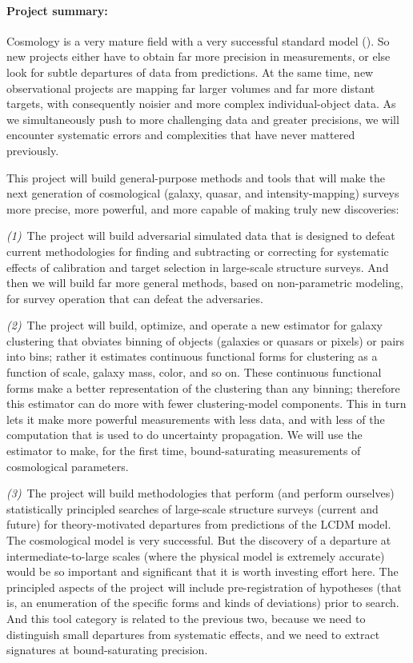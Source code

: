 \documentclass[12pt, fullpage, letterpaper]{article}
\newcommand{\LCDM}{\acronym{LCDM}}
\begin{document}
\paragraph{Project summary:}
Cosmology is a very mature field with a very successful standard model
(\LCDM).
So new projects either have to obtain far more precision in
measurements, or else look for subtle departures of data from
predictions.
At the same time, new observational projects are mapping far larger
volumes and far more distant targets, with consequently noisier and
more complex individual-object data.
As we simultaneously push to more challenging data and greater
precisions, we will encounter systematic errors and complexities that
have never mattered previously.

This project will build general-purpose methods and tools that will
make the next generation of cosmological (galaxy, quasar, and
intensity-mapping) surveys more precise, more powerful, and more
capable of making truly new discoveries:

\textsl{(1)}~The project will build adversarial simulated data that is designed to
defeat current methodologies for finding and subtracting or correcting
for systematic effects of calibration and target selection in
large-scale structure surveys.
And then we will build far more general methods, based on
non-parametric modeling, for survey operation that can defeat the
adversaries.

\textsl{(2)}~The project will build, optimize, and operate a new estimator for
galaxy clustering that obviates binning of objects (galaxies or
quasars or pixels) or pairs into bins; rather it estimates continuous
functional forms for clustering as a function of scale, galaxy mass,
color, and so on.
These continuous functional forms make a better representation of the
clustering than any binning; therefore this estimator can do more with
fewer clustering-model components.
This in turn lets it make more powerful measurements with less data,
and with less of the computation that is used to do uncertainty
propagation.
We will use the estimator to make, for the first time,
bound-saturating measurements of cosmological parameters.

\textsl{(3)}~The project will build methodologies that perform (and perform
ourselves) statistically principled searches of large-scale structure
surveys (current and future) for theory-motivated departures from
predictions of the LCDM model.
The cosmological model is very successful.
But the discovery of a departure at intermediate-to-large scales
(where the physical model is extremely accurate) would be so important
and significant that it is worth investing effort here.
The principled aspects of the project will include pre-registration of
hypotheses (that is, an enumeration of the specific forms and kinds of
deviations) prior to search.
And this tool category is related to the previous two, because we need
to distinguish small departures from systematic effects, and we need
to extract signatures at bound-saturating precision.
\end{document}
